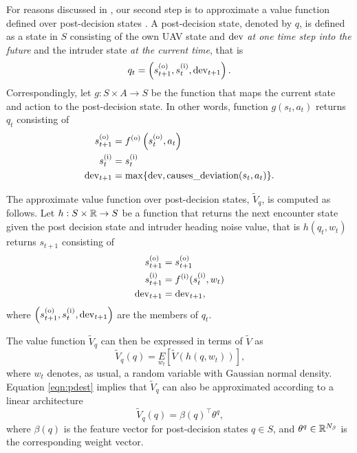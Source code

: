 For reasons discussed in , our second step is to approximate a value function defined over post-decision states \cite{DB:05}. A post-decision state, denoted by $q$, is defined as a state in $S$ consisting of the own UAV state and $\mathrm{dev }$ \emph{at one time step into the future} and the intruder state \emph{at the current time}, that is
\begin{equation} \label{eqn:pd}
    q_t = \left(s^{(\mathrm{o})}_{t+1}, s^{(\mathrm{i})}_t, \mathrm{dev }_{t+1}\right) \text{.}
\end{equation}
Correspondingly, let $g:S\times A\to S$ be the function that maps the current state and action to the post-decision state. In other words, function $g(s_t,a_t)$ returns $q_t$ consisting of
\begin{align}\label{eqn:g}
    s^{(\mathrm{o})}_{t+1} &= f^{(\mathrm{o})}\left(s^{(\mathrm{o})}_t, a_t \right) \nonumber\\
    s^{(\mathrm{i})}_t     &= s^{(\mathrm{i})}_t \nonumber\\
    \mathrm{dev }_{t+1} &= \max\{\mathrm{dev }, \text{causes\_deviation}(s_t,a_t)\} \text{.}
\end{align}

The approximate value function over post-decision states, $\tilde{V}_q$, is computed as follows.
Let $h:S \times \mathbb{R} \to S$ be a function that returns the next encounter state given the post decision state and intruder heading noise value, that is $h(q_t,w_t)$ returns $s_{t+1}$ consisting of
\begin{align}
    s^{(\mathrm{o})}_{t+1} &= s^{(\mathrm{o})}_{t+1} \\
    s^{(\mathrm{i})}_{t+1} &= f^{(\mathrm{i})}(s^{(\mathrm{i})}_{t}, w_t) \\
    \mathrm{dev }_{t+1} &= \mathrm{dev }_{t+1} \text{,}
\end{align}
where $\left(s^{(\mathrm{o})}_{t+1}, s^{(\mathrm{i})}_t, \mathrm{dev }_{t+1}\right)$ are the members of $q_t$.

The value function $\tilde{V}_q$ can then be expressed in terms of $\tilde{V}$ as
\begin{equation} \label{eqn:pdest}
    \tilde{V}_q(q) = \underset{w_t}{E} \left[ \tilde{V}\left(h\left(q,w_t\right)\right) \right] \text{,}
\end{equation}
where $w_t$ denotes, as usual, a random variable with Gaussian normal density.  Equation \eqref{eqn:pdest} implies that $\tilde{V}_q$ can also be approximated according to a linear architecture 
\begin{equation}
    \tilde{V}_q(q) = \beta(q)^\top \theta^q \text{,}
\end{equation}
where $\beta(q)$ is the  feature vector for post-decision states $q\in S$, and $\theta^q \in \mathbb{R}^{N_\beta}$ is the corresponding weight vector.


